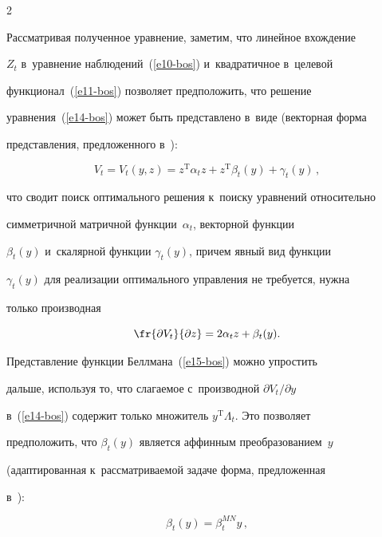 \begin{multicols}{2}
     


     Рассматривая полученное уравнение, заметим, что линейное вхождение 


$Z_t$ в~уравнение наблюдений~(\ref{e10-bos}) и~квадратичное в~целевой 


функционал~(\ref{e11-bos}) позволяет предположить, что решение 


уравнения~(\ref{e14-bos}) может быть представлено в~виде (векторная форма 


представления, предложенного в~\cite{16-bos}):


     \begin{equation}


     V_t=V_t(y,z)=z^{\mathrm{T}} \alpha_t z+z^{\mathrm{T}}\beta_t(y)+\gamma_t(y)\,,


     \label{e15-bos}


     \end{equation}


что сводит поиск оптимального решения к~поиску уравнений относительно 


симметричной матричной функции~$\alpha_t$, векторной функции 


$\beta_t(y)$ и~скалярной функции $\gamma_t(y)$, причем явный вид функции 


$\gamma_t(y)$ для реализации оптимального управления не требуется, нужна 


только производная 


$$


\fr{\partial V_t}{\partial z}= 2\alpha_t z+ \beta_t(y).


$$ 


     


     Представление функции Беллмана~(\ref{e15-bos}) можно упростить 


дальше, используя то, что сла\-га\-емое с~производной $\partial V_t/\partial y$ 


в~(\ref{e14-bos}) содержит только множитель $y^{\mathrm{T}}\Lambda_t$. Это позволяет 


предположить, что $\beta_t(y)$ является аффинным преобразованием~$y$ 


(адаптированная к~рассматриваемой задаче форма, предложенная  


в~\cite{17-bos}):


     \begin{equation}


     \beta_t(y)=\beta_t^{MN} y\,,


     \label{e16-bos}



\end{equation}
\end{multicols}

